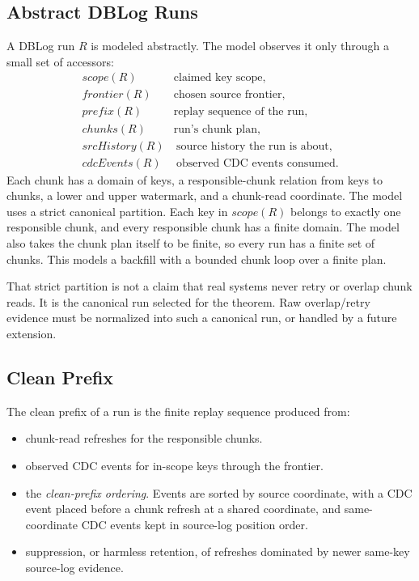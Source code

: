 \documentclass[letterpaper,10pt,twocolumn]{article}
\newcommand{\Scope}{\mathit{scope}}
\newcommand{\Frontier}{\mathit{frontier}}
\newcommand{\CleanPrefix}{\mathit{prefix}}
\newcommand{\Chunks}{\mathit{chunks}}
\newcommand{\SourceHistory}{\mathit{srcHistory}}
\newcommand{\CdcEvents}{\mathit{cdcEvents}}
\providecommand{\tightlist}{\setlength{\itemsep}{0pt}\setlength{\parskip}{0pt}}
\begin{document}
\subsection{Abstract DBLog Runs}\label{abstract-dblog-runs}

A DBLog run $R$ is modeled abstractly. The model observes it only
through a small set of accessors:
\[
  \begin{aligned}
    \Scope(R)\quad             &\text{claimed key scope},\\
    \Frontier(R)\quad           &\text{chosen source frontier},\\
    \CleanPrefix(R)\quad        &\text{replay sequence of the run},\\
    \Chunks(R)\quad             &\text{run's chunk plan},\\
    \SourceHistory(R)           &\ \text{source history the run is about},\\
    \CdcEvents(R)               &\ \text{observed CDC events consumed.}
  \end{aligned}
\]
Each chunk has a domain of keys, a responsible-chunk relation from
keys to chunks, a lower and upper watermark, and a chunk-read
coordinate. The model uses a strict canonical partition. Each key in
$\Scope(R)$ belongs to exactly one responsible chunk, and every
responsible chunk has a finite domain. The model also takes the chunk
plan itself to be finite, so every run has a finite set of chunks. This
models a backfill with a bounded chunk loop over a finite plan.

That strict partition is not a claim that real systems never retry or
overlap chunk reads. It is the canonical run selected for the theorem.
Raw overlap/retry evidence must be normalized into such a canonical run,
or handled by a future extension.

\subsection{Clean Prefix}\label{clean-prefix}

The clean prefix of a run is the finite replay sequence produced from:

\begin{itemize}\tightlist
\item chunk-read refreshes for the responsible chunks.
\item observed CDC events for in-scope keys through the frontier.
\item the \emph{clean-prefix ordering}. Events are sorted by source
  coordinate, with a CDC event placed before a chunk refresh at a
  shared coordinate, and same-coordinate CDC events kept in
  source-log position order.
\item suppression, or harmless retention, of refreshes dominated by
  newer same-key source-log evidence.
\end{itemize}
\end{document}
